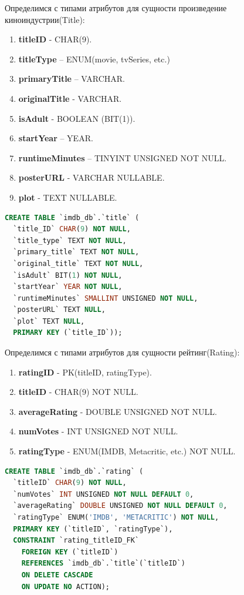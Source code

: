\documentclass[12pt,a4paper]{article}
\begin{document}
Определимся с типами атрибутов для сущности произведение киноиндустрии(Title):
\begin{enumerate}
    \item \textbf{titleID} - CHAR(9).
    \item \textbf{titleType} – ENUM(movie, tvSeries, etc.)
    \item \textbf{primaryTitle} – VARCHAR.
    \item \textbf{originalTitle} - VARCHAR.
    \item \textbf{isAdult} - BOOLEAN (BIT(1)).
    \item \textbf{startYear} – YEAR.
    \item \textbf{runtimeMinutes} – TINYINT UNSIGNED NOT NULL.
    \item \textbf{posterURL} - VARCHAR NULLABLE.
    \item \textbf{plot} - TEXT NULLABLE.
\end{enumerate} \par
\begin{lstlisting}[language=SQL]
CREATE TABLE `imdb_db`.`title` (
  `title_ID` CHAR(9) NOT NULL,
  `title_type` TEXT NOT NULL,
  `primary_title` TEXT NOT NULL,
  `original_title` TEXT NOT NULL,
  `isAdult` BIT(1) NOT NULL,
  `startYear` YEAR NOT NULL,
  `runtimeMinutes` SMALLINT UNSIGNED NOT NULL,
  `posterURL` TEXT NULL,
  `plot` TEXT NULL,
  PRIMARY KEY (`title_ID`));
\end{lstlisting}
Определимся с типами атрибутов для сущности рейтинг(Rating):
\begin{enumerate}
    \item \textbf{ratingID} - PK(titleID, ratingType).
    \item \textbf{titleID} - CHAR(9) NOT NULL.
    \item \textbf{averageRating} - DOUBLE UNSIGNED NOT NULL.
    \item \textbf{numVotes} - INT UNSIGNED NOT NULL.
    \item \textbf{ratingType} - ENUM(IMDB, Metacritic, etc.) NOT NULL.
\end{enumerate} \par
\begin{lstlisting}[language=SQL]
CREATE TABLE `imdb_db`.`rating` (
  `titleID` CHAR(9) NOT NULL,
  `numVotes` INT UNSIGNED NOT NULL DEFAULT 0,
  `averageRating` DOUBLE UNSIGNED NOT NULL DEFAULT 0,
  `ratingType` ENUM('IMDB', 'METACRITIC') NOT NULL,
  PRIMARY KEY (`titleID`, `ratingType`),
  CONSTRAINT `rating_titleID_FK` 
    FOREIGN KEY (`titleID`)
    REFERENCES `imdb_db`.`title`(`titleID`) 
    ON DELETE CASCADE
    ON UPDATE NO ACTION);
\end{lstlisting}
\end{document}
